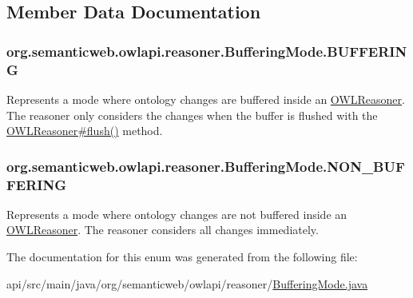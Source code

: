 \subsection{Member Data Documentation}
\hypertarget{enumorg_1_1semanticweb_1_1owlapi_1_1reasoner_1_1_buffering_mode_afb4c0fc2e7e437308a2c0cd6223b1b02}{
\subsubsection[{B\-U\-F\-F\-E\-R\-I\-N\-G}]{\setlength{\rightskip}{0pt plus 5cm}org.\-semanticweb.\-owlapi.\-reasoner.\-Buffering\-Mode.\-B\-U\-F\-F\-E\-R\-I\-N\-G}}\label{enumorg_1_1semanticweb_1_1owlapi_1_1reasoner_1_1_buffering_mode_afb4c0fc2e7e437308a2c0cd6223b1b02}
Represents a mode where ontology changes are buffered inside an \hyperlink{interfaceorg_1_1semanticweb_1_1owlapi_1_1reasoner_1_1_o_w_l_reasoner}{O\-W\-L\-Reasoner}. The reasoner only considers the changes when the buffer is flushed with the \hyperlink{interfaceorg_1_1semanticweb_1_1owlapi_1_1reasoner_1_1_o_w_l_reasoner_ad2d99b8530c4b07c34ff11fdc02a8979}{O\-W\-L\-Reasoner\#flush()} method. \hypertarget{enumorg_1_1semanticweb_1_1owlapi_1_1reasoner_1_1_buffering_mode_ab07dceb7cab753a700819c0dbfabe87c}{
\subsubsection[{N\-O\-N\-\_\-\-B\-U\-F\-F\-E\-R\-I\-N\-G}]{\setlength{\rightskip}{0pt plus 5cm}org.\-semanticweb.\-owlapi.\-reasoner.\-Buffering\-Mode.\-N\-O\-N\-\_\-\-B\-U\-F\-F\-E\-R\-I\-N\-G}}\label{enumorg_1_1semanticweb_1_1owlapi_1_1reasoner_1_1_buffering_mode_ab07dceb7cab753a700819c0dbfabe87c}
Represents a mode where ontology changes are not buffered inside an \hyperlink{interfaceorg_1_1semanticweb_1_1owlapi_1_1reasoner_1_1_o_w_l_reasoner}{O\-W\-L\-Reasoner}. The reasoner considers all changes immediately. 

The documentation for this enum was generated from the following file\-:\begin{DoxyCompactItemize}
\item 
api/src/main/java/org/semanticweb/owlapi/reasoner/\hyperlink{_buffering_mode_8java}{Buffering\-Mode.\-java}\end{DoxyCompactItemize}
